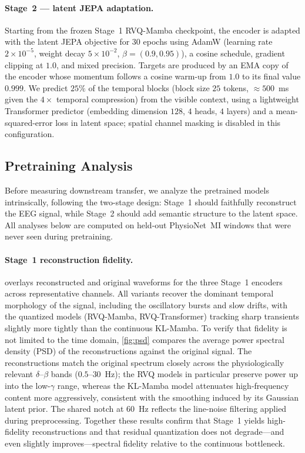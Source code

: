 \documentclass{article}
\begin{document}
\paragraph{Stage~2 — latent JEPA adaptation.}
Starting from the frozen Stage~1 RVQ-Mamba checkpoint, the encoder is adapted with the latent JEPA objective for $30$ epochs using AdamW (learning rate $2\times10^{-5}$, weight decay $5\times10^{-2}$, $\beta=(0.9,0.95)$), a cosine schedule, gradient clipping at $1.0$, and mixed precision.
Targets are produced by an EMA copy of the encoder whose momentum follows a cosine warm-up from $1.0$ to its final value $0.999$.
We predict $25\%$ of the temporal blocks (block size $25$ tokens, $\approx500$~ms given the $4\times$ temporal compression) from the visible context, using a lightweight Transformer predictor (embedding dimension $128$, $4$ heads, $4$ layers) and a mean-squared-error loss in latent space; spatial channel masking is disabled in this configuration.



\subsection{Pretraining Analysis}
\label{subsec:pretraining_analysis}

Before measuring downstream transfer, we analyze the pretrained models intrinsically, following the two-stage design: Stage~1 should faithfully reconstruct the EEG signal, while Stage~2 should add semantic structure to the latent space.
All analyses below are computed on held-out PhysioNet~MI windows that were never seen during pretraining.

\paragraph{Stage~1 reconstruction fidelity.}
 overlays reconstructed and original waveforms for the three Stage~1 encoders across representative channels.
All variants recover the dominant temporal morphology of the signal, including the oscillatory bursts and slow drifts, with the quantized models (RVQ-Mamba, RVQ-Transformer) tracking sharp transients slightly more tightly than the continuous KL-Mamba.
To verify that fidelity is not limited to the time domain, \cref{fig:psd} compares the average power spectral density (PSD) of the reconstructions against the original signal.
The reconstructions match the original spectrum closely across the physiologically relevant $\delta$--$\beta$ bands ($0.5$--$30$~Hz); the RVQ models in particular preserve power up into the low-$\gamma$ range, whereas the KL-Mamba model attenuates high-frequency content more aggressively, consistent with the smoothing induced by its Gaussian latent prior.
The shared notch at $60$~Hz reflects the line-noise filtering applied during preprocessing.
Together these results confirm that Stage~1 yields high-fidelity reconstructions and that residual quantization does not degrade---and even slightly improves---spectral fidelity relative to the continuous bottleneck.
\end{document}
